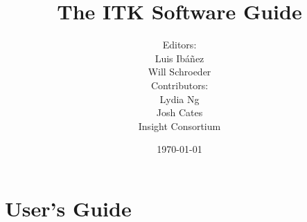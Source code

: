 \documentclass[twoside,titlepage]{InsightBook}
\title{The ITK Software Guide}
\author{Editors:\\Luis Ib\'{a}\~{n}ez\\Will Schroeder\\
        Contributors:\\Lydia Ng\\Josh Cates\\Insight Consortium}
\date{\today}
\newif\ifitkFullVersion
\begin{document}
\maketitle

\frontmatter

\ifitkFullVersion 

\fi

\tableofcontents


\mainmatter




\ifitkFullVersion
\part{Introduction}




\fi


\part{User's Guide}

\ifitkFullVersion



\fi

\ifitkFullVersion

\fi



\ifitkFullVersion
\part{Developer's Guide}



\fi

\backmatter





\end{document}
